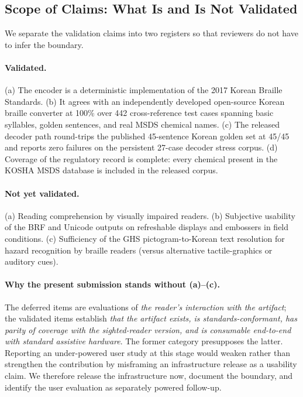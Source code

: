 \documentclass[smallextended]{svjour3}
\begin{document}
\subsection{Scope of Claims: What Is and Is Not Validated}
\label{sec:scope-of-claims}

We separate the validation claims into two registers so that reviewers do not have to infer the boundary.

\paragraph{Validated.}
(a) The encoder is a deterministic implementation of the 2017 Korean Braille Standards. (b) It agrees with an independently developed open-source Korean braille converter at 100\% over 442 cross-reference test cases spanning basic syllables, golden sentences, and real MSDS chemical names. (c) The released decoder path round-trips the published 45-sentence Korean golden set at 45/45 and reports zero failures on the persistent 27-case decoder stress corpus. (d) Coverage of the regulatory record is complete: every chemical present in the KOSHA MSDS database is included in the released corpus.

\paragraph{Not yet validated.}
(a) Reading comprehension by visually impaired readers. (b) Subjective usability of the BRF and Unicode outputs on refreshable displays and embossers in field conditions. (c) Sufficiency of the GHS pictogram-to-Korean text resolution for hazard recognition by braille readers (versus alternative tactile-graphics or auditory cues).

\paragraph{Why the present submission stands without (a)--(c).}
The deferred items are evaluations of \emph{the reader's interaction with the artifact}; the validated items establish \emph{that the artifact exists, is standards-conformant, has parity of coverage with the sighted-reader version, and is consumable end-to-end with standard assistive hardware}. The former category presupposes the latter. Reporting an under-powered user study at this stage would weaken rather than strengthen the contribution by misframing an infrastructure release as a usability claim. We therefore release the infrastructure now, document the boundary, and identify the user evaluation as separately powered follow-up.
\end{document}
